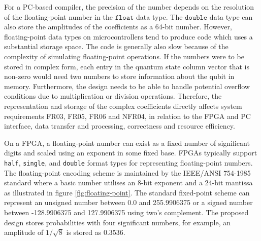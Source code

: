 For a PC-based compiler, the precision of the number depends on the resolution of the floating-point number in the $\texttt{float}$ data type. The $\texttt{double}$ data type can also store the amplitudes of the coefficients as a 64-bit number. However, floating-point data types on microcontrollers tend to produce code which uses a substantial storage space. The code is generally also slow because of the complexity of simulating floating-point operations. If the numbers were to be stored in complex form, each entry in the quantum state column vector that is non-zero would need two numbers to store information about the qubit in memory. Furthermore, the design needs to be able to handle potential overflow conditions due to multiplication or division operations. Therefore, the representation and storage of the complex coefficients directly affects system requirements FR03, FR05, FR06 and NFR04, in relation to the FPGA and PC interface, data transfer and processing, correctness and resource efficiency.

On a FPGA, a floating-point number can exist as a fixed number of significant digits and scaled using an exponent in some fixed base. FPGAs typically support \texttt{half}, \texttt{single}, and \texttt{double} format types for representing floating-point numbers. The floating-point encoding scheme is maintained by the IEEE/ANSI 754-1985 standard where a basic number utilises an 8-bit exponent and a 24-bit mantissa as illustrated in figure \ref{fig:floating-point}. The standard fixed-point scheme can represent an unsigned number between 0.0 and 255.9906375 or a signed number between -128.9906375 and 127.9906375 using two's complement. The proposed design stores probabilities with four significant numbers, for example, an amplitude of $1/\sqrt{8}$ is stored as 0.3536. 

